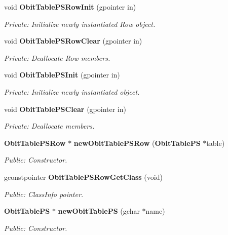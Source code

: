 \begin{CompactItemize}
\item 
void {\bf Obit\-Table\-PSRow\-Init} (gpointer in)
\begin{CompactList}\small\item\em Private: Initialize newly instantiated Row object. \item\end{CompactList}\item 
void {\bf Obit\-Table\-PSRow\-Clear} (gpointer in)
\begin{CompactList}\small\item\em Private: Deallocate Row members. \item\end{CompactList}\item 
void {\bf Obit\-Table\-PSInit} (gpointer in)
\begin{CompactList}\small\item\em Private: Initialize newly instantiated object. \item\end{CompactList}\item 
void {\bf Obit\-Table\-PSClear} (gpointer in)
\begin{CompactList}\small\item\em Private: Deallocate members. \item\end{CompactList}\item 
{\bf Obit\-Table\-PSRow} $\ast$ {\bf new\-Obit\-Table\-PSRow} ({\bf Obit\-Table\-PS} $\ast$table)
\begin{CompactList}\small\item\em Public: Constructor. \item\end{CompactList}\item 
gconstpointer {\bf Obit\-Table\-PSRow\-Get\-Class} (void)
\begin{CompactList}\small\item\em Public: Class\-Info pointer. \item\end{CompactList}\item 
{\bf Obit\-Table\-PS} $\ast$ {\bf new\-Obit\-Table\-PS} (gchar $\ast$name)
\begin{CompactList}\small\item\em Public: Constructor. \item\end{CompactList}\item 

\end{CompactItemize}
